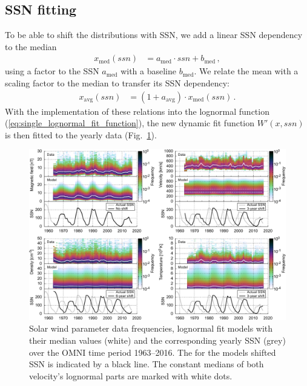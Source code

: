 \subsection{SSN fitting}
\label{sec:ssn_fitting}
To be able to shift the distributions with SSN, we add a linear SSN dependency to the median
\begin{align}
	x_\text{med}(ssn) &= a_\text{med} \cdot ssn + b_\text{med}\,,	\label{eq:median_with_ssn}
\end{align}
using a factor to the SSN $a_\text{med}$ with a baseline $b_\text{med}$. We relate the mean with a scaling factor to the median to transfer its SSN dependency:
\begin{align}
	x_\text{avg}(ssn) &= (1 + a_\text{avg}) \cdot x_\text{med}(ssn)\,.	\label{eq:mean_with_ssn}
\end{align}
With the implementation of these relations into the lognormal function (\ref{eq:single_lognormal_fit_function}), the new dynamic fit function $W'(x,ssn)$ is then fitted to the yearly data (Fig.~\ref{fig:OMNI_yearly_BVdblNTSSN_fit_d_plot}).
\begin{figure}
	\includegraphics[width=18cm]{figures/OMNI_yearly_BVdblNTSSN_fit_d_plot.pdf}
	\caption{Solar wind parameter data frequencies, lognormal fit models with their median values (white) and the corresponding yearly SSN (grey) over the OMNI time period 1963--2016. The for the models shifted SSN is indicated by a black line. The constant medians of both velocity's lognormal parts are marked with white dots.}
	\label{fig:OMNI_yearly_BVdblNTSSN_fit_d_plot}
\end{figure}

